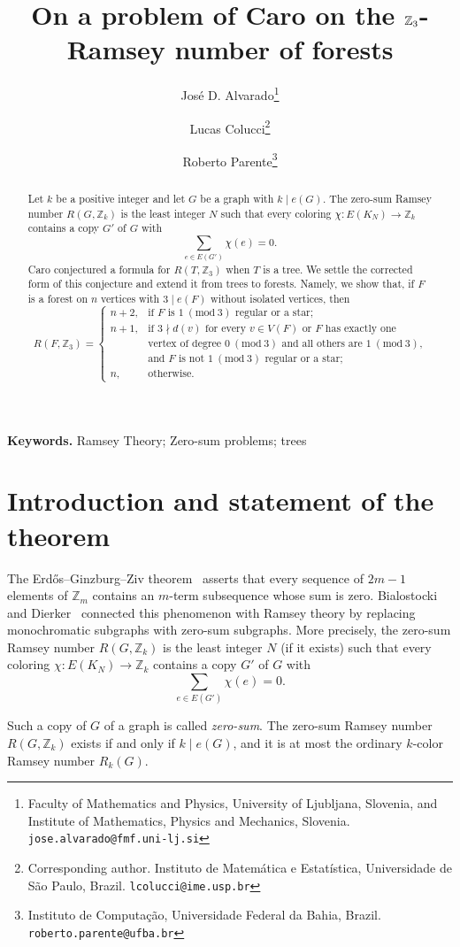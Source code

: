 \documentclass[11pt]{article}
\title{On a problem of Caro on the $\Z_3$-Ramsey number of forests}
\author{
    Jos\'e D. Alvarado\thanks{Faculty of Mathematics and Physics, University of Ljubljana, Slovenia, and Institute of Mathematics, Physics and Mechanics, Slovenia. \texttt{jose.alvarado@fmf.uni-lj.si}} 
    \and Lucas Colucci\thanks{Corresponding author. Instituto de Matem\'atica e Estat\'istica, Universidade de S\~ao Paulo, Brazil. \texttt{lcolucci@ime.usp.br}} 
    \and Roberto Parente\thanks{Instituto de Computa\c{c}\~ao, Universidade Federal da Bahia, Brazil. \texttt{roberto.parente@ufba.br}}
}
\date{}
\newcommand{\Z}{\mathbb Z}
\newcommand{\Mod}[1]{\ (\mathrm{mod}\ #1)}
\begin{document}
\maketitle

\begin{abstract}
Let $k$ be a positive integer and let $G$ be a graph with $k\mid e(G)$.  The zero-sum Ramsey number $R(G,\Z_k)$ is the least integer $N$ such that every coloring $\chi:E(K_N)\to \Z_k$ contains a copy $G'$ of $G$ with
\[
        \sum_{e\in E(G')}\chi(e)=0.
\]
Caro conjectured a formula for $R(T,\Z_3)$ when $T$ is a tree.  We settle the corrected form of this conjecture and extend it from trees to forests.  Namely, we show that, if $F$ is a forest on $n$ vertices with $3\mid e(F)$ without isolated vertices, then
\[
R(F,\mathbb{Z}_3)=\begin{cases}
			n+2, & \text{if $F$ is $1 \Mod 3$ regular or a star;}\\
            n+1, & \text{if $3\nmid d(v)$ for every $v \in V(F)$ or $F$ has exactly one}\\ 
            & \text{vertex of degree $0 \Mod 3$ and all others are $1 \Mod 3$,}\\ 
            & \text{and $F$ is not $1 \Mod 3$ regular or a star;}\\
            n, & \text{otherwise.}
		 \end{cases}
\]
\end{abstract}

\noindent\textbf{Keywords.} Ramsey Theory; Zero-sum problems; trees

\section{Introduction and statement of the theorem}

The Erd\H{o}s--Ginzburg--Ziv theorem~\cite{Erdos1961-qb} asserts that every sequence of $2m-1$ elements of $\Z_m$ contains an $m$-term subsequence whose sum is zero.  Bialostocki and Dierker~\cite{Bialostocki1990-zw,Bialostocki1990-vx,Bialostocki1992-sa} connected this phenomenon with Ramsey theory by replacing monochromatic subgraphs with zero-sum subgraphs. More precisely, the zero-sum Ramsey number $R(G,\Z_k)$ is the least integer $N$ (if it exists) such that every coloring $\chi:E(K_N)\to \Z_k$ contains a copy $G'$ of $G$ with
\[
        \sum_{e\in E(G')}\chi(e)=0.
\]

Such a copy of $G$ of a graph is called \emph{zero-sum}. The zero-sum Ramsey number $R(G,\Z_k)$ exists if and only if $k\mid e(G)$, and it is at most the ordinary $k$-color Ramsey number $R_k(G)$.  
\end{document}
